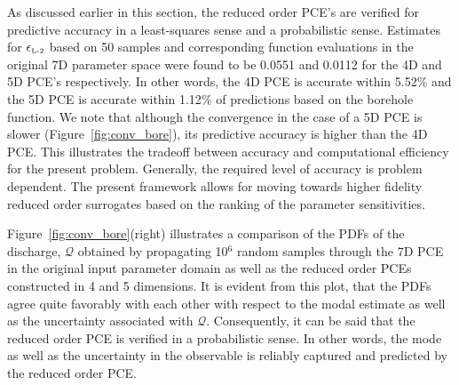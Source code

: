 As discussed earlier in this section, the reduced order PCE's are verified for
predictive accuracy in a least-squares sense and a probabilistic sense.
Estimates for $\epsilon_{\mbox{\tiny{L-2}}}$ based on 50 samples and
corresponding function evaluations in the original 7D parameter space were
found to be 0.0551 and 0.0112 for the 4D and 5D PCE's respectively. In other
words, the 4D PCE is accurate within 5.52$\%$ and the 5D PCE is accurate within
1.12$\%$ of predictions based on the borehole function. We note  that although
the convergence in the case of a 5D PCE is slower (Figure~\ref{fig:conv_bore}),
its predictive accuracy is higher than the 4D PCE. This illustrates the
tradeoff between accuracy and computational efficiency for the present 
problem. Generally, the required level of accuracy is problem dependent. 
The present framework allows for moving towards higher fidelity 
reduced order surrogates based on the ranking of the parameter sensitivities. 
 


Figure~\ref{fig:conv_bore}(right) illustrates a comparison of the PDFs
of the
discharge, $\mathcal{Q}$ obtained by propagating 10$^6$ random
samples through the 7D PCE in the original input parameter domain as well as
the reduced order PCEs constructed in 4 and 5 dimensions. 
It is evident from this plot, that the PDFs agree quite favorably with each
other with respect to the modal estimate as well as the uncertainty associated with 
$\mathcal{Q}$. 
Consequently, it can be said that the reduced order PCE is verified in a
probabilistic sense. In other words, the mode as well as the uncertainty in the
observable is reliably captured and predicted by the reduced order PCE. 
 
